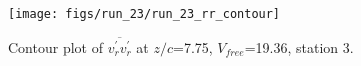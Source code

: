\begin{figure}[H]
\centering
\texttt{[image: figs/run\_23/run\_23\_rr\_contour]}
\caption{Contour plot of $\overline{v_{r}^{\prime} v_{r}^{\prime}}$ at $z/c$=7.75, $V_{free}$=19.36, station 3.}
\label{fig:run_23_rr_contour}
\end{figure}


